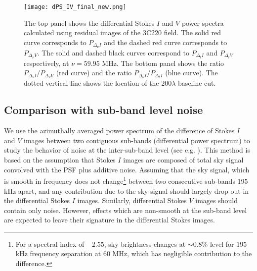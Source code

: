 \documentclass[fleqn,usenatbib]{mnras}
\begin{document}
\begin{figure}
\centering
\texttt{[image: dPS\_IV\_final\_new.png]}
    \caption{The top panel shows the differential Stokes $I$ and $V$ power spectra calculated using residual images of the 3C220 field. The solid red curve corresponds to $P_{\Delta_{\nu} I}$ and the dashed red curve corresponds to $P_{\Delta_{\nu} V}$. The solid and dashed black curves correspond to $P_{\Delta_{t} I}$ and $P_{\Delta_{t} V}$ respectively, at $\nu = 59.95$ MHz. The bottom panel shows the ratio $P_{\Delta_{\nu} I}/P_{\Delta_{\nu} V}$ (red curve) and the ratio $P_{\Delta_{\nu} I}/P_{\Delta_{t} I}$ (blue curve). The dotted vertical line shows the location of the $200\lambda$ baseline cut.} 
\label{fig:dPS_IV}
\end{figure}

\subsection{Comparison with sub-band level noise}\label{subsec:excess_compare}

We use the azimuthally averaged power spectrum of the difference of Stokes $I$ and $V$ images between two contiguous sub-bands (differential power spectrum) to study the behavior of noise at the inter-sub-band level (see e.g. \citealt{patil2016,gehlot2018}). This method is based on the assumption that Stokes $I$ images are composed of total sky signal convolved with the PSF plus additive noise. Assuming that the sky signal, which is smooth in frequency does not change\footnote{ For a spectral index of $-2.55$, sky brightness changes at $\sim 0.8\%$ level for 195 kHz frequency separation at 60 MHz, which has negligible contribution to the difference.} between two consecutive sub-bands 195 kHz apart, and any contribution due to the sky signal should largely drop out in the differential Stokes $I$ images. Similarly, differential Stokes $V$ images should contain only noise. However, effects which are non-smooth at the sub-band level are expected to leave their signature in the differential Stokes images.  
\end{document}
